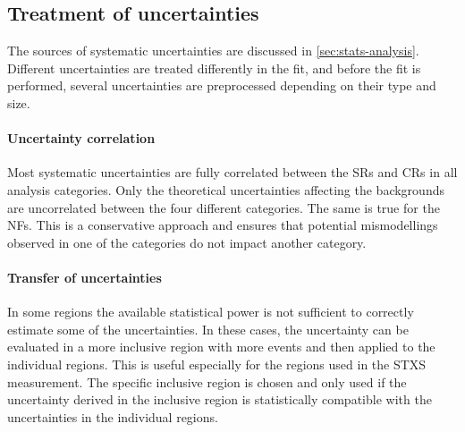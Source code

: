 \subsection{Treatment of uncertainties}
The sources of systematic uncertainties are discussed in \cref{sec:stats-analysis}. 
Different uncertainties are treated differently in the fit, and before the fit is performed, several uncertainties are preprocessed depending on their type and size. 

\paragraph{Uncertainty correlation}
Most systematic uncertainties are fully correlated between the SRs and CRs in all analysis categories. Only the theoretical uncertainties affecting the backgrounds are uncorrelated between the four different categories. The same is true for the NFs. This is a conservative approach and ensures that potential mismodellings observed in one of the categories do not impact another category. 

\paragraph{Transfer of uncertainties}
In some regions the available statistical power is not sufficient to correctly estimate some of the uncertainties. 
In these cases, the uncertainty can be evaluated in a more inclusive region with more events and then applied to the individual regions. This is useful especially for the regions used in the STXS measurement. The specific inclusive region is chosen and only used if the uncertainty derived in the inclusive region is statistically compatible with the uncertainties in the individual regions. 

